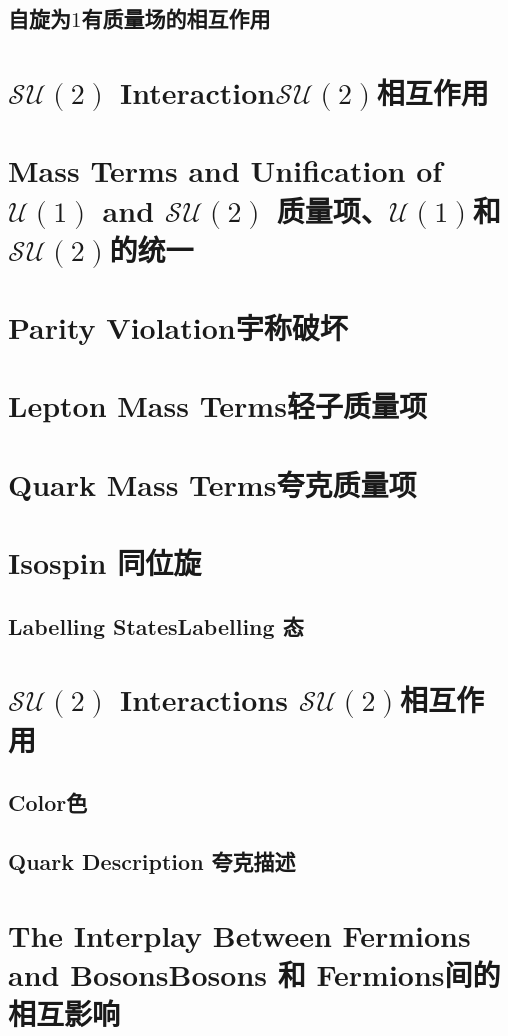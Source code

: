 \subsection{自旋为$1$有质量场的相互作用}\label{sec7.1.8}

\section[$\mathcal{SU}(2)$相互作用]{$\mathcal{SU}(2)$ Interaction\quad $\mathcal{SU}(2)$相互作用}\label{sec7.2}

\section[质量项、${\mathcal U}(1)$和$\mathcal{SU}(2)$的统一]{Mass Terms and Unification of ${\mathcal U}(1)$ and $\mathcal{SU}(2)$ \quad 质量项、${\mathcal U}(1)$和$\mathcal{SU}(2)$的统一}\label{sec7.3}

\section[宇称破坏]{Parity Violation\quad 宇称破坏}\label{sec7.4}

\section[轻子质量项]{Lepton Mass Terms\quad 轻子质量项}\label{sec7.5}

\section[夸克质量项]{Quark Mass Terms\quad 夸克质量项}\label{sec7.6}

\section[同位旋]{Isospin \quad 同位旋}\label{sec7.7}

\subsection[Labelling 态]{Labelling States\quad Labelling 态}\label{sec7.7.1}

\section[$\mathcal{SU}(3)$相互作用]{$\mathcal{SU}(2)$ Interactions \quad $\mathcal{SU}(2)$相互作用}\label{sec7.8}

\subsection[色]{Color\quad 色}\label{sec7.8.1}

\subsection[夸克描述]{Quark Description \quad 夸克描述}\label{sec7.8.2}

\section[Bosons 和 Fermions 间的相互影响]{The Interplay Between Fermions and Bosons\quad Bosons 和 Fermions间的相互影响}\label{sec7.9}
